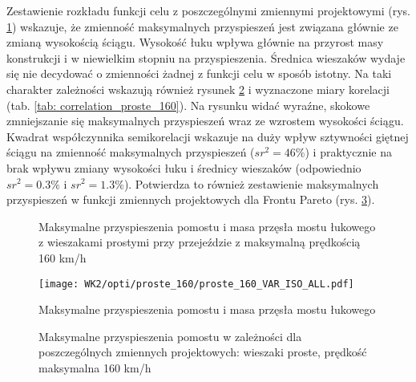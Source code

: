 Zestawienie rozkładu funkcji celu z poszczególnymi zmiennymi projektowymi (rys. \ref{fig:wk2_opti_proste_160_variables}) wskazuje, że zmienność maksymalnych przyspieszeń jest związana głównie ze zmianą wysokością ściągu. Wysokość łuku wpływa głównie na przyrost masy konstrukcji i w niewielkim stopniu na przyspieszenia. Średnica wieszaków wydaje się nie decydować o zmienności żadnej z funkcji celu w sposób istotny. Na taki charakter zależności wskazują również rysunek \ref{fig:wk2_opti_proste_160_vars_all} i wyznaczone miary korelacji (tab. \ref{tab: correlation_proste_160}). Na rysunku widać wyraźne, skokowe zmniejszanie się maksymalnych przyspieszeń wraz ze wzrostem wysokości ściągu. Kwadrat współczynnika semikorelacji wskazuje na duży wpływ sztywności giętnej ściągu na zmienność maksymalnych przyspieszeń ($sr^2=46\%$) i praktycznie na brak wpływu zmiany wysokości łuku i średnicy wieszaków (odpowiednio $sr^2=0.3\%$ i $sr^2=1.3\%$). Potwierdza to również zestawienie maksymalnych przyspieszeń w funkcji zmiennych projektowych dla Frontu Pareto (rys. \ref{fig:wk2_opti_proste_160_var_2d}).

\begin{figure}[hbt!]
	\centering
	\captionsetup{justification=centering}
	\caption{Maksymalne przyspieszenia pomostu i masa przęsła mostu łukowego z wieszakami prostymi przy przejeździe z maksymalną prędkością 160 km/h}
	\label{fig:wk2_opti_proste_160_variables}
\end{figure}

\begin{figure}[hbt!]
	\centering
	\texttt{[image: WK2/opti/proste\_160/proste\_160\_VAR\_ISO\_ALL.pdf]}
	\captionsetup{justification=centering}
	\caption{Maksymalne przyspieszenia pomostu i masa przęsła mostu łukowego }
	\label{fig:wk2_opti_proste_160_vars_all}
\end{figure}
\begin{figure}[hbt!]
	\centering
	\captionsetup{justification=centering}
	\caption{Maksymalne przyspieszenia pomostu w zależności dla poszczególnych zmiennych projektowych: wieszaki proste, prędkość maksymalna 160 km/h}
	\label{fig:wk2_opti_proste_160_var_2d}
\end{figure}

